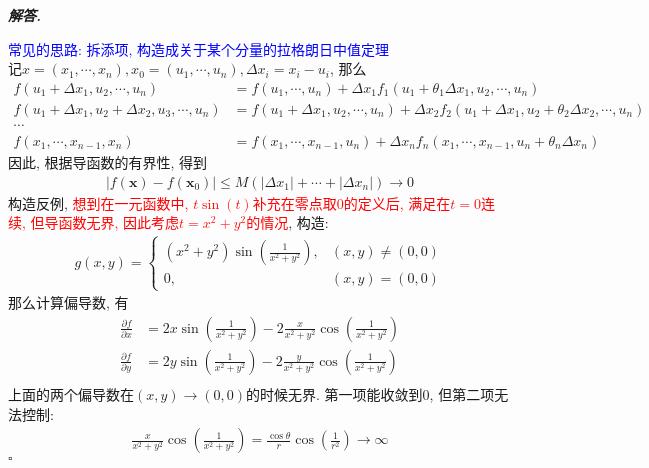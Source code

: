 \documentclass[10pt, a4paper, oneside]{ctexart}
\newenvironment{solution}{%
  \par\noindent\textbf{\textit{解答. }}\ignorespaces
}{%
  \hfill\ensuremath{\square}\par %
}
\begin{document}
\begin{solution}
\textcolor{blue}{常见的思路: 拆添项, 构造成关于某个分量的拉格朗日中值定理}\\
记$x=(x_1,\cdots,x_n), x_0=(u_1,\cdots,u_n), \Delta x_i=x_i-u_i$, 那么
\begin{align*}
f(u_1+\Delta x_1, u_2,\cdots,u_n)&=f(u_1,\cdots,u_n)+\Delta x_1f_{1}(u_1+\theta_1 \Delta x_1,u_2,\cdots,u_n)\\
f(u_1+\Delta x_1, u_2+\Delta x_2,u_3,\cdots,u_n)&=f(u_1+\Delta x_1,u_2,\cdots,u_n)+\Delta x_2f_{2}(u_1+\Delta x_1,u_2+\theta_2 \Delta x_2,\cdots,u_n)\\
\cdots &\\
f(x_1,\cdots,x_{n-1},x_n)&=f(x_1,\cdots,x_{n-1},u_n)+\Delta x_n f_{n}(x_1,\cdots,x_{n-1},u_n+\theta_n \Delta x_n)
\end{align*}
因此, 根据导函数的有界性, 得到
\begin{align*}
    |f(\bm{x})-f(\bm{x}_0) |\leq M(|\Delta x_1|+\cdots+|\Delta x_n|)\to 0
\end{align*}
构造反例, \textcolor{red}{想到在一元函数中, $t\sin (t)$补充在零点取$0$的定义后, 满足在$t=0$连续, 但导函数无界, 因此考虑$t=x^2+y^2$的情况}, 构造:
\begin{align*}
    g(x,y)=\begin{cases}
        (x^2+y^2)\sin(\frac{1}{x^2+y^2}), & (x,y)\neq (0,0)\\
        0, & (x,y)=(0,0)
    \end{cases}
\end{align*}
那么计算偏导数, 有
\begin{align*}
\frac{\partial f}{\partial x}&=2x\sin(\frac{1}{x^2+y^2})-2\frac{x}{x^2+y^2}\cos(\frac{1}{x^2+y^2})\\
\frac{\partial f}{\partial y}&=2y\sin(\frac{1}{x^2+y^2})-2\frac{y}{x^2+y^2}\cos(\frac{1}{x^2+y^2})\\
\end{align*}
上面的两个偏导数在$(x,y)\to(0,0)$的时候无界. 第一项能收敛到$0$, 但第二项无法控制:
\begin{align*}
    \frac{x}{x^2+y^2}\cos(\frac{1}{x^2+y^2})=\frac{\cos \theta}{r}\cos(\frac{1}{r^2})\to \infty
\end{align*}
\end{solution}
\end{document}

